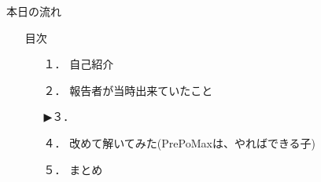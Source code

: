 \begin{frame}{本日の流れ}
  \begin{itemize}
      \item[] 目次
      \begin{itemize}[itemsep=1.3ex, leftmargin=1cm]
        \item[１．] {\color{cud_lightgray} 自己紹介}
        \item[２．] {\color{cud_lightgray} 報告者が当時出来ていたこと}
        \item[▶３．] 
        \item[４．] 改めて解いてみた(PrePoMaxは、やればできる子)
        \item[５．] まとめ
     \end{itemize}
  \end{itemize}
\end{frame}
